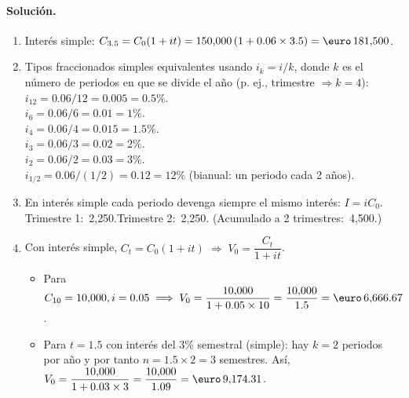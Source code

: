 \documentclass[12pt,a4paper]{article}
\newenvironment{solucion}{\paragraph{Solución.}}{}
\begin{document}
\begin{solucion}
\begin{enumerate}[label=\alph*)]
  \item Interés simple: $C_{3.5}=C_0(1+it)=150{,}000\,(1+0.06\times 3.5)=\text{\euro}\,181{,}500$.
  \item Tipos fraccionados simples equivalentes usando $i_k=i/k$, donde $k$ es el número de periodos en que se divide el año (p. ej., trimestre $\Rightarrow k=4$):\\
        $i_{12}=0.06/12=0.005=0.5\%$.\\
        $i_{6}=0.06/6=0.01=1\%$.\\
        $i_{4}=0.06/4=0.015=1.5\%$.\\
        $i_{3}=0.06/3=0.02=2\%$.\\
        $i_{2}=0.06/2=0.03=3\%$.\\
        $i_{1/2}=0.06/(1/2)=0.12=12\%$ (bianual: un periodo cada 2 años).
  \item En interés simple cada periodo devenga siempre el mismo interés: $I=i C_0$.\\
        Trimestre 1: \text{\euro}\,2{,}250.\quad Trimestre 2: \text{\euro}\,2{,}250.\; (Acumulado a 2 trimestres: \text{\euro}\,4{,}500.)
  \item Con interés simple, $C_t=C_0(1+it)\;\Rightarrow\; V_0=\dfrac{C_t}{1+it}$.\\
        \begin{itemize}
        \item  Para $C_{10}=10{,}000, i=0.05 \implies V_0=\dfrac{10{,}000}{1+0.05\times10}=\dfrac{10{,}000}{1.5}=\text{\euro}\,6{,}666.67$.\\
         \item  Para $t=1.5$ con interés del $3\%$ semestral (simple): hay $k=2$ periodos por año y por tanto $n=1.5\times 2=3$ semestres. Así, $V_0=\dfrac{10{,}000}{1+0.03\times 3}=\dfrac{10{,}000}{1.09}=\text{\euro}\,9{,}174.31$.
        \end{itemize}
\end{enumerate}
\end{solucion}
\end{document}
